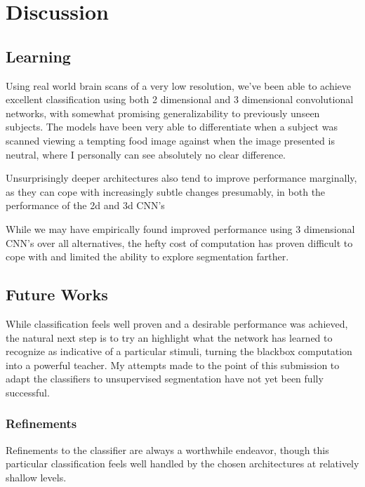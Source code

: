 \section{Discussion}\label{sec:discussion}

\subsection{Learning}\label{subsec:learning}

Using real world brain scans of a very low resolution, we've been able to achieve excellent classification using both
2 dimensional and 3 dimensional convolutional networks, with somewhat promising generalizability to previously unseen subjects.
The models have been very able to differentiate when a subject was scanned viewing a tempting food image against when the image
presented is neutral, where I personally can see absolutely no clear difference.

Unsurprisingly deeper architectures also tend to improve performance marginally,
as they can cope with increasingly subtle changes presumably, in both the performance of the 2d and 3d CNN's

While we may have empirically found improved performance using 3 dimensional CNN's over all alternatives,
the hefty cost of computation has proven difficult to cope with and limited the ability to explore segmentation farther.

\subsection{Future Works}\label{subsec:future-works}

While classification feels well proven and a desirable performance was achieved,
the natural next step is to try an highlight what the network has learned to recognize
as indicative of a particular stimuli, turning the blackbox computation into a powerful teacher.
My attempts made to the point of this submission to adapt the classifiers to unsupervised segmentation
have not yet been fully successful.

\subsubsection{Refinements}\label{refinements}

Refinements to the classifier are always a worthwhile endeavor, though this particular classification feels well
handled by the chosen architectures at relatively shallow levels.

